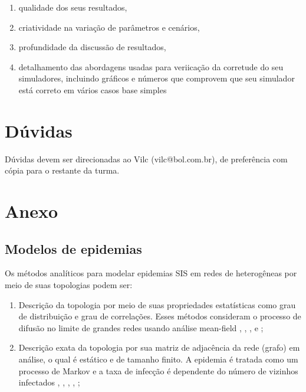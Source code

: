 \documentclass[a4paper]{article}
\begin{document}
\begin{enumerate}
\item qualidade dos seus resultados, 
\item criatividade na variação de parâmetros e cenários,
\item profundidade da discussão de resultados,
\item detalhamento das abordagens usadas para veriicação da corretude do seu simuladores, incluindo gráficos e números que comprovem que seu simulador está correto em vários casos base simples 
\end{enumerate}


\section{Dúvidas}
Dúvidas devem ser direcionadas ao Vilc (vilc@bol.com.br), de preferência com cópia para o restante da turma.


\section{Anexo}
\subsection{Modelos de epidemias}

Os métodos analíticos para modelar epidemias SIS em redes de heterogêneas por meio de suas topologias podem ser:

\begin{enumerate}
	\item  Descrição da topologia por meio de suas propriedades estatísticas como grau de distribuição e grau de correlações. Esses métodos consideram o processo de difusão no limite de grandes redes usando análise mean-field \cite{barthelemy2008dynamical}, \cite{danon2011networks}, \cite{santos2011emergent}, \cite{house2011insights} e \cite{pastor2001epidemic}; 

	\item Descrição exata da topologia por sua matriz de adjacência da rede (grafo) em análise, o qual é estático e de tamanho finito. A epidemia é tratada como um processo de Markov e a taxa de infecção é dependente do número de vizinhos infectados  \cite{draief2006thresholds}, \cite{ganesh2005effect}, \cite{chakrabarti2008epidemic}, \cite{wang2003epidemic}, \cite{zhang2012accounting};
    
\end{enumerate}
\end{document}
